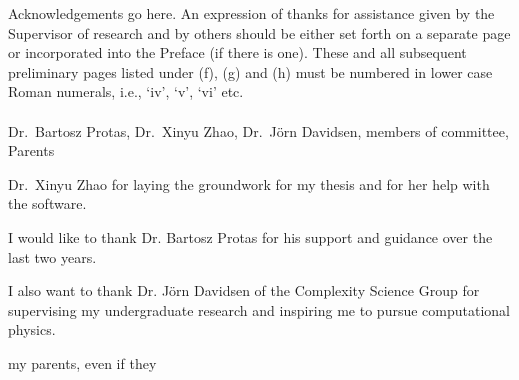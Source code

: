 
Acknowledgements go here. An expression of thanks for assistance given by the Supervisor of research and by others should be either 
set forth on a separate page or incorporated into the Preface (if there is one). These and all subsequent 
preliminary pages listed under (f), (g) and (h) must be numbered in lower case Roman numerals, i.e., ‘iv’, 
‘v’, ‘vi’ etc. 
\\~\\
Dr.~Bartosz Protas, Dr.~Xinyu Zhao, Dr.~J\"{o}rn Davidsen, members of committee, Parents 

Dr.~Xinyu Zhao for laying the groundwork for my thesis and for her help with the software.

I would like to thank Dr. Bartosz Protas for his support and guidance over the last two years.

I also want to thank Dr. J\"{o}rn Davidsen of the Complexity Science Group for supervising my undergraduate research and inspiring me to pursue computational physics.

my parents, even if they  